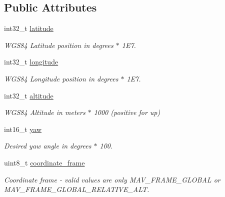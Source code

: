 \subsection*{Public Attributes}
\begin{DoxyCompactItemize}
\item 
int32\+\_\+t \hyperlink{struct____mavlink__set__global__position__setpoint__int__t_a5ce6831e10b85d86c1641ab5e1e7793f}{latitude}
\begin{DoxyCompactList}\small\item\em W\+G\+S84 Latitude position in degrees $\ast$ 1\+E7. \end{DoxyCompactList}\item 
int32\+\_\+t \hyperlink{struct____mavlink__set__global__position__setpoint__int__t_afe5579c39588820501f68c5114bf0902}{longitude}
\begin{DoxyCompactList}\small\item\em W\+G\+S84 Longitude position in degrees $\ast$ 1\+E7. \end{DoxyCompactList}\item 
int32\+\_\+t \hyperlink{struct____mavlink__set__global__position__setpoint__int__t_a5b6969b11abbf7cb228976942d8417b9}{altitude}
\begin{DoxyCompactList}\small\item\em W\+G\+S84 Altitude in meters $\ast$ 1000 (positive for up) \end{DoxyCompactList}\item 
\hypertarget{struct____mavlink__set__global__position__setpoint__int__t_add86bfbf2c48e2ce222feaf301e9f7a4}{int16\+\_\+t \hyperlink{struct____mavlink__set__global__position__setpoint__int__t_add86bfbf2c48e2ce222feaf301e9f7a4}{yaw}}\label{struct____mavlink__set__global__position__setpoint__int__t_add86bfbf2c48e2ce222feaf301e9f7a4}

\begin{DoxyCompactList}\small\item\em Desired yaw angle in degrees $\ast$ 100. \end{DoxyCompactList}\item 
\hypertarget{struct____mavlink__set__global__position__setpoint__int__t_a305c83285aa51ece52abfdf4e395b248}{uint8\+\_\+t \hyperlink{struct____mavlink__set__global__position__setpoint__int__t_a305c83285aa51ece52abfdf4e395b248}{coordinate\+\_\+frame}}\label{struct____mavlink__set__global__position__setpoint__int__t_a305c83285aa51ece52abfdf4e395b248}

\begin{DoxyCompactList}\small\item\em Coordinate frame -\/ valid values are only M\+A\+V\+\_\+\+F\+R\+A\+M\+E\+\_\+\+G\+L\+O\+B\+A\+L or M\+A\+V\+\_\+\+F\+R\+A\+M\+E\+\_\+\+G\+L\+O\+B\+A\+L\+\_\+\+R\+E\+L\+A\+T\+I\+V\+E\+\_\+\+A\+L\+T. \end{DoxyCompactList}\end{DoxyCompactItemize}


